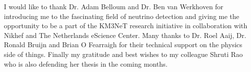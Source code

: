 

\begin{acknowledgements}      %
I would like to thank Dr. Adam Belloum and Dr. Ben van Werkhoven for
introducing me to the fascinating field of neutrino detection and
giving me the opportunity to be a part of the KM3NeT research
initiative in collaboration with Nikhef and The Netherlands eScience
Center. Many thanks to Dr. Roel Aaij, Dr. Ronald Bruijn and Brian O
Fearraigh for their technical support on the physics side of things.
Finally my gratitude and best wishes to my colleague Shruti Rao who is
also defending her thesis in the coming months.
\end{acknowledgements}



